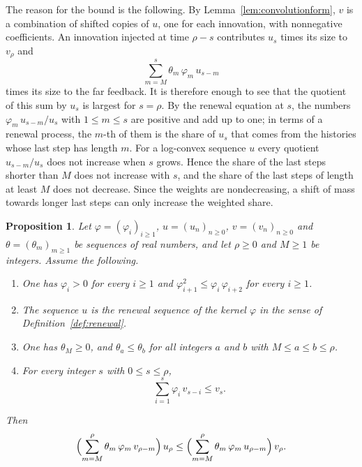 \documentclass{amsart}
\newtheorem{proposition}[theorem]{Proposition}
\theoremstyle{definition}
\theoremstyle{remark}
\numberwithin{equation}{section}
\begin{document}
The reason for the bound is the following. By
Lemma~\ref{lem:convolutionform}, $v$ is a combination of shifted copies of
$u$, one for each innovation, with nonnegative coefficients. An innovation
injected at time $\rho-s$ contributes $u_s$ times its size to $v_\rho$ and
\[
\sum_{m=M}^{s}\theta_m\,\varphi_m\,u_{s-m}
\]
times its size to the far feedback. It is therefore enough to see that the
quotient of this sum by $u_s$ is largest for $s=\rho$. By the
renewal equation at $s$, the numbers $\varphi_m\,u_{s-m}/u_s$ with
$1\le m\le s$ are positive and add up to one; in terms of a renewal process,
the $m$-th of them is the share of $u_s$ that comes from the histories whose
last step has length $m$. For a log-convex sequence $u$ every quotient
$u_{s-m}/u_s$ does not increase when $s$ grows. Hence the share of the last
steps shorter than $M$ does not increase with $s$, and the share of
the last steps of length at least $M$ does not decrease. Since the weights
are nondecreasing, a shift of mass towards longer last steps can only
increase the weighted share.

\begin{proposition}\label{prop:extremecolumn}
Let $\varphi=(\varphi_i)_{i\ge1}$, $u=(u_n)_{n\ge0}$, $v=(v_n)_{n\ge0}$ and
$\theta=(\theta_m)_{m\ge1}$ be sequences of real numbers, and let $\rho\ge0$
and $M\ge1$ be integers. Assume the following.
\begin{enumerate}
\item One has $\varphi_i>0$ for every $i\ge1$ and
$\varphi_{i+1}^2\le\varphi_i\,\varphi_{i+2}$ for every $i\ge1$.
\item The sequence $u$ is the renewal sequence of the kernel $\varphi$ in the
sense of Definition~\ref{def:renewal}.
\item One has $\theta_M\ge0$, and $\theta_a\le\theta_b$ for all integers $a$
and $b$ with $M\le a\le b\le\rho$.
\item For every integer $s$ with $0\le s\le\rho$,
\[
\sum_{i=1}^{s}\varphi_i\,v_{s-i}\le v_s .
\]
\end{enumerate}
Then
\[
\Bigl(\sum_{m=M}^{\rho}\theta_m\,\varphi_m\,v_{\rho-m}\Bigr)\,u_\rho
\le
\Bigl(\sum_{m=M}^{\rho}\theta_m\,\varphi_m\,u_{\rho-m}\Bigr)\,v_\rho .
\]
\end{proposition}
\end{document}
